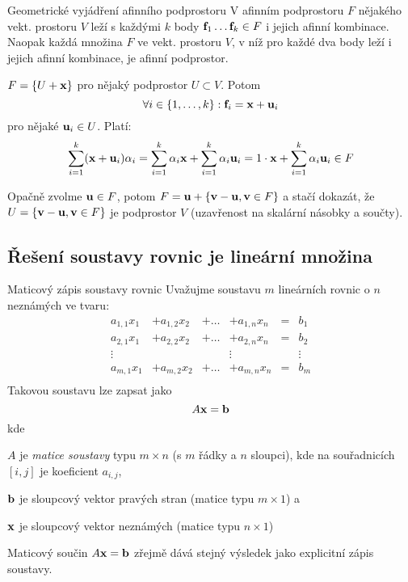 \begin{vetaN}{Geometrické vyjádření afinního podprostoru}
V afinním podprostoru $F$ nějakého vekt. prostoru $V$ leží s každými $k$ body $\mathbf{f}_1 \ldots \mathbf{f}_k \in F$ i jejich afinní kombinace. Naopak každá množina $F$ ve vekt. prostoru $V$, v níž pro každé dva body leží i jejich afinní kombinace, je afinní podprostor.

\begin{dukaz}
$F=\{U+\mathbf{x}\}$ pro nějaký podprostor $U\subset V$. Potom $$\forall i\in\{1,\dots,k\}:\mathbf{f}_i=\mathbf{x}+\mathbf{u}_i$$ pro nějaké $\mathbf{u}_i\in U$. Platí:
$$\sum_{i=1}^k(\mathbf{x}+\mathbf{u}_i)\alpha_i = \sum_{i=1}^k\alpha_i\mathbf{x} + \sum_{i=1}^k\alpha_i\mathbf{u}_i = 1\cdot\mathbf{x} + \sum_{i=1}^k\alpha_i\mathbf{u}_i\in F$$

Opačně zvolme $\mathbf{u}\in F$, potom $F=\mathbf{u}+\{\mathbf{v}-\mathbf{u},\mathbf{v}\in F\}$ a stačí dokazát, že $U=\{\mathbf{v}-\mathbf{u},\mathbf{v}\in F\}$ je podprostor $V$ (uzavřenost na skalární násobky a součty).
\end{dukaz}
\end{vetaN}


\subsection{Řešení soustavy rovnic je lineární množina}

\begin{definiceN}{Maticový zápis soustavy rovnic}
Uvažujme soustavu $m$ lineárních rovnic o $n$ neznámých ve tvaru:
$$\begin{matrix}
a_{1,1}x_1 &+ a_{1,2}x_2 &+ \dots &+ a_{1,n}x_n &=& b_1 \\
a_{2,1}x_1 &+ a_{2,2}x_2 &+ \dots &+ a_{2,n}x_n &=& b_2 \\
    \vdots &             &        &  \vdots     & & \vdots \\
a_{m,1}x_1 &+ a_{m,2}x_2 &+ \dots &+ a_{m,n}x_n &=& b_m \\
\end{matrix}$$
Takovou soustavu lze zapsat jako 
$$A\mathbf{x}=\mathbf{b}$$
kde 
\begin{pitemize}
    \item $A$ je \emph{matice soustavy} typu $m\times n$ (s $m$ řádky a $n$ sloupci), kde na souřadnicích $[i,j]$ je koeficient $a_{i,j}$,
    \item $\mathbf{b}$ je sloupcový vektor pravých stran (matice typu $m\times 1$) a
    \item $\mathbf{x}$ je sloupcový vektor neznámých (matice typu $n\times 1$)
\end{pitemize}
Maticový součin $A\mathbf{x}=\mathbf{b}$ zřejmě dává stejný výsledek jako explicitní zápis soustavy.
\end{definiceN}



